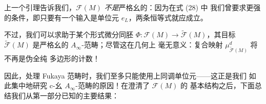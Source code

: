 
上一个引理告诉我们，$\mathcal F(M)$ \emph{不是}严格幺的：因为在式 (28) 中
我们曾要求更强的条件，即只要有一个输入是单位元 $e_L$，两条恒等式就应成立。

不过，我们可以求助于某个形式微分同胚
$\Phi:\mathcal F(M)\to\widetilde{\mathcal F}(M)$，其目标
$\widetilde{\mathcal F}(M)$ 是严格幺的 $A_\infty$-范畴；尽管这在几何上
毫无意义：复合映射 $\mu^d_{\widetilde{\mathcal F}(M)}$ 将不再是伪全纯
多边形的计数！

因此，处理 Fukaya 范畴时，我们至多只能使用上同调单位元——这正是我们
如此集中地研究 c-幺 $A_\infty$-范畴的原因！在澄清了 $\mathcal F(M)$ 的
基本结构之后，下面总结我们从第一部分已知的主要结果：

